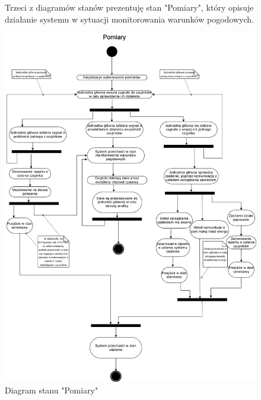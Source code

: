 \documentclass{article}
\begin{document}
\begin{figure}
    \centering
    \begin{minipage}{0.6\textwidth}
        \centering
        \large Trzeci z diagramów stanów prezentuję stan "Pomiary", który opisuje działanie systemu w sytuacji monitorowania warunków pogodowych.
    \end{minipage}
    \includegraphics[scale=0.5]{pomiary.png}
    \caption{Diagram stanu "Pomiary"}
    \label{etykieta3}
\end{figure}
\end{document}
